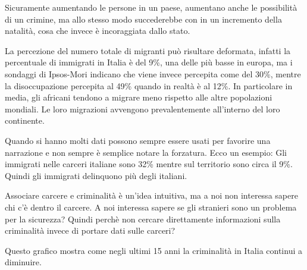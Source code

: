 \documentclass[12pt]{book} %
\begin{document}
Sicuramente aumentando le persone
in un paese, aumentano anche le possibilità di un crimine, ma allo stesso modo succederebbe con in un incremento della
natalità, cosa che invece è incoraggiata dallo stato.

La percezione del numero totale di migranti può risultare deformata, infatti la percentuale di immigrati in Italia è del 9\%, una delle più basse in europa, ma i sondaggi di Ipsos-Mori indicano che viene invece percepita come del 30\%, mentre la disoccupazione percepita al 49\% quando
in realtà è al 12\%.
In particolare in media, gli africani tendono a migrare meno rispetto alle altre popolazioni mondiali. Le loro migrazioni avvengono prevalentemente all'interno del loro continente.

Quando si hanno molti dati possono sempre essere usati per favorire una narrazione e non sempre è semplice notare la forzatura.
Ecco un esempio: Gli immigrati nelle carceri italiane sono 32\% mentre sul territorio sono circa il 9\%. Quindi gli immigrati delinquono più degli italiani.

Associare carcere e criminalità è un'idea intuitiva, ma a noi non interessa sapere chi c'è dentro il carcere. A noi interessa sapere se gli stranieri sono un problema per la sicurezza? Quindi perchè non cercare direttamente informazioni sulla criminalità invece di portare dati sulle carceri?

Questo grafico mostra come negli ultimi 15 anni la criminalità in Italia continui a diminuire.

\bigskip
\end{document}
